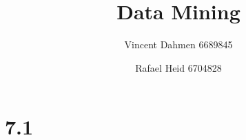\documentclass[12pt,a4paper]{article}
\title{Data Mining}
\author{Vincent Dahmen 6689845 \and Rafael Heid 6704828}
\begin{document}
\maketitle{}


\section*{7.1}





\end{document}
